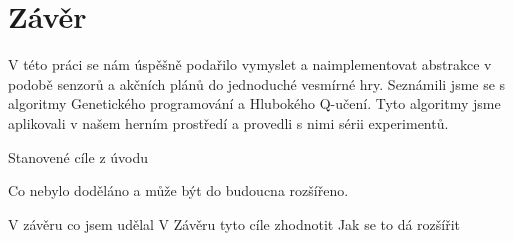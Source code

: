 \chapter*{Závěr}


V této práci se nám úspěšně podařilo vymyslet a naimplementovat abstrakce v podobě senzorů a akčních plánů do jednoduché vesmírné hry.
Seznámili jsme se s algoritmy Genetického programování a Hlubokého Q-učení.
Tyto algoritmy jsme aplikovali v našem herním prostředí a provedli s nimi sérii experimentů.



Stanovené cíle z úvodu

Co nebylo doděláno a může být do budoucna rozšířeno.



V závěru co jsem udělal
V Závěru tyto cíle zhodnotit
Jak se to dá rozšířit
